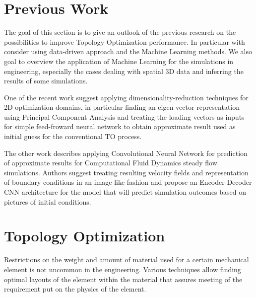 \section{Previous Work}

The goal of this section is to give an outlook of the previous research on the possibilities to improve Topology Optimization performance.
In particular with consider using data-driven approach and the Machine Learning methods.
We also goal to overview the application of Machine Learning for the simulations in engineering, especially the cases dealing with spatial 3D data and inferring the results of some simulations.
\medskip

One of the recent work \cite{bibl:prevwork_pca} suggest applying dimensionality-reduction techniques for 2D optimization domains, in particular finding an eigen-vector representation using Principal Component Analysis\cite{} and treating the loading vectors as inputs for simple feed-froward neural network to obtain approximate result used as initial guess for the conventional TO process.
\medskip

The other work \cite{prev:prevwork_cnncfd} describes applying Convolutional Neural Network for prediction of approximate results for Computational Fluid Dynamics steady flow simulations. 
Authors suggest treating resulting velocity fields and representation of boundary conditions in an image-like fashion and propose an Encoder-Decoder CNN architecture for the model that will predict simulation outcomes based on pictures of initial conditions.

\section{Topology Optimization}

Restrictions on the weight and amount of material used for a certain mechanical element is not uncommon in the engineering.
Various techniques allow finding optimal layouts of the element within the material that assures meeting of the requirement put on the physics of the element. 
\medskip

